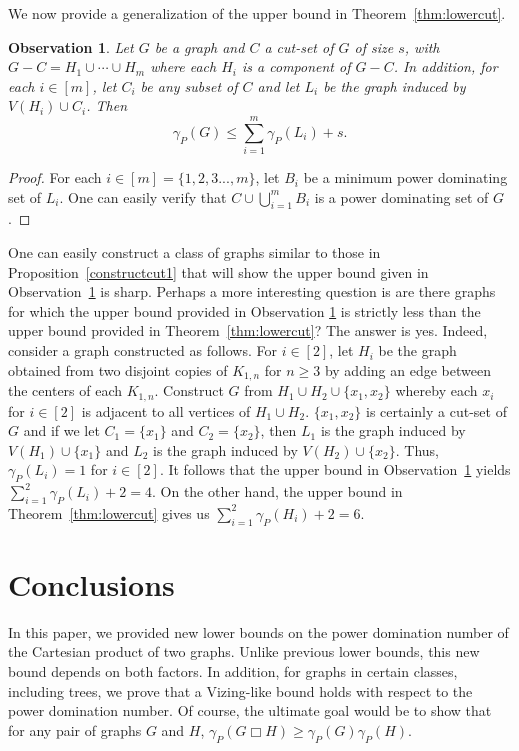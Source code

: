 \documentclass[11pt]{article}
\newtheorem{observation}{Observation}
\begin{document}
We now provide a generalization of the upper bound in Theorem~\ref{thm:lowercut}.

\begin{observation}\label{thm:cutgen}
Let $G$ be a graph and $C$ a cut-set of $G$ of size $s$, with $G-C = H_1 \cup \cdots \cup H_m$ where each $H_i$ is a component of $G-C$.  In addition, for each $i \in [m]$, let $C_i$ be any subset of $C$ and let $L_i$ be the graph induced by $V(H_i) \cup C_i$. Then
\[\gamma_P(G) \leq \sum_{i=1}^m\gamma_P(L_i)+s.\]
\end{observation}

\begin{proof}
For each $i \in [m]=\{1,2,3...,m\}$, let $B_i$ be a minimum power dominating set of $L_i$. One can easily verify that $C \cup \bigcup_{i=1}^m B_i$ is a power dominating set of $G$.
\end{proof}

 One can easily construct a class of graphs similar to those in Proposition~\ref{constructcut1} that will show the upper bound given in Observation~\ref{thm:cutgen} is sharp. Perhaps a more interesting question is are there graphs for which the upper bound provided in Observation  \ref{thm:cutgen} is strictly less than the upper bound provided in Theorem~\ref{thm:lowercut}? The answer is yes. Indeed, consider a graph constructed as follows. For $i\in [2]$, let $H_i$ be the graph obtained from two disjoint copies of $K_{1, n}$ for $n \ge 3$ by adding an edge between the centers of each $K_{1, n}$. Construct $G$ from $H_1 \cup H_2 \cup \{x_1, x_2\}$ whereby each $x_i$ for $i \in [2]$ is adjacent to all vertices of $H_1 \cup H_2$. $\{x_1, x_2\}$ is certainly a cut-set of $G$ and if we let $C_1 = \{x_1\}$ and $C_2 = \{x_2\}$, then $L_1$ is the graph induced by $V(H_1) \cup \{x_1\}$ and $L_2$ is the graph induced by $V(H_2) \cup \{x_2\}$. Thus, $\gamma_P(L_i) =1$ for $i\in [2]$. It follows that the upper bound in Observation~\ref{thm:cutgen} yields $\sum_{i=1}^2\gamma_P(L_i) + 2 = 4$. On the other hand, the upper bound in Theorem~\ref{thm:lowercut} gives us $\sum_{i=1}^2\gamma_P(H_i) + 2 = 6$. 

\section{Conclusions}
In this paper, we provided new lower bounds on the power domination number of the Cartesian product of two graphs. Unlike previous lower bounds, this new bound depends on both factors. In addition, for graphs in certain classes, including trees, we prove that a Vizing-like bound holds with respect to the power domination number. Of course, the ultimate goal would be to show that for any pair of graphs $G$ and $H$, $\gamma_P(G\Box H) \ge \gamma_P(G)\gamma_P(H)$. 
\end{document}
